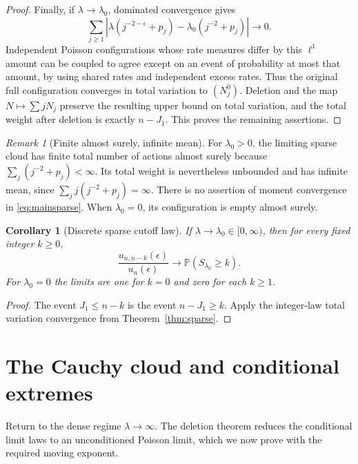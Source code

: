 \documentclass[11pt,a4paper]{article}
\numberwithin{equation}{section}
\newtheorem{corollary}[theorem]{Corollary}
\theoremstyle{definition}
\theoremstyle{remark}
\newtheorem{remark}[theorem]{Remark}
\newcommand{\Prob}{\mathbb P}
\newcommand{\ee}{\epsilon}
\begin{document}
\begin{proof}
Finally, if $\lambda\to\lambda_0$, dominated convergence gives
\[
 \sum_{j\ge1}\left|
 \lambda(j^{-2-\ee}+p_j)-\lambda_0(j^{-2}+p_j)\right|\longrightarrow0.
\]
Independent Poisson configurations whose rate measures differ by this
$\ell^1$ amount can be coupled to agree except on an event of probability
at most that amount, by using shared rates and independent excess rates.
Thus the original full configuration converges in total variation to
$(N_j^0)$. Deletion and the map $N\mapsto\sum jN_j$ preserve the resulting
upper bound on total variation, and the total weight after deletion is
exactly $n-J_1$. This proves the remaining assertions.
\end{proof}

\begin{remark}[Finite almost surely, infinite mean]
For $\lambda_0>0$, the limiting sparse cloud has finite total number of
actions almost surely because $\sum_j(j^{-2}+p_j)<\infty$. Its total
weight is nevertheless unbounded and has infinite mean, since
$\sum_j j(j^{-2}+p_j)=\infty$. There is no assertion of moment convergence
in \eqref{eq:mainsparse}. When $\lambda_0=0$, its configuration is empty
almost surely.
\end{remark}

\begin{corollary}[Discrete sparse cutoff law]\label{cor:sparsecutoff}
If $\lambda\to\lambda_0\in[0,\infty)$, then for every fixed integer
$k\ge0$,
\begin{equation}\label{eq:sparsecutoff}
 \frac{u_{n,n-k}(\ee)}{u_n(\ee)}
 \longrightarrow\Prob(S_{\lambda_0}\ge k).
\end{equation}
For $\lambda_0=0$ the limits are one for $k=0$ and zero for each $k\ge1$.
\end{corollary}
\begin{proof}
The event $J_1\le n-k$ is the event $n-J_1\ge k$. Apply the integer-law
total variation convergence from Theorem~\ref{thm:sparse}.
\end{proof}

\section{The Cauchy cloud and conditional extremes}
\label{sec:cloud}
Return to the dense regime $\lambda\to\infty$. The deletion theorem
reduces the conditional limit laws to an unconditioned Poisson limit,
which we now prove with the required moving exponent.
\end{document}
